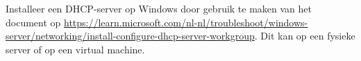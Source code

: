 Installeer een DHCP-server op Windows door gebruik te maken van het document op \url{https://learn.microsoft.com/nl-nl/troubleshoot/windows-server/networking/install-configure-dhcp-server-workgroup}. Dit kan op een fysieke server of op een virtual machine.
